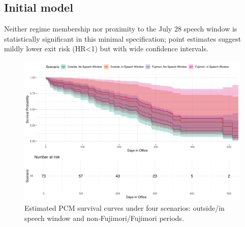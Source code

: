 \documentclass[a4paper, 12pt]{article}
\begin{document}
\subsection{Initial model}




Neither regime membership nor proximity to the July 28 speech window is statistically significant in this minimal specification; point estimates suggest mildly lower exit risk (HR<1) but with wide confidence intervals.











  \begin{figure}[ht]
    \centering
    \includegraphics[width=\textwidth]{combined_survival_plot.pdf}
    \caption{Estimated PCM survival curves under four scenarios: outside/in speech window and non‑Fujimori/Fujimori periods.}
    \label{fig:survival_curves}
  \end{figure}
\end{document}
